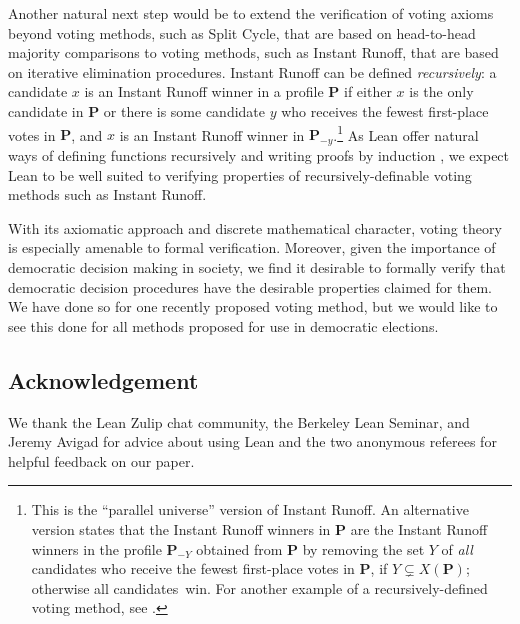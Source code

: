 \documentclass[runningheads]{llncs}
\begin{document}
Another natural next step would be to extend the verification of voting axioms beyond voting methods, such as Split Cycle, that are based on head-to-head majority comparisons to voting methods, such as Instant Runoff, that are based on iterative elimination procedures. Instant Runoff can be defined \textit{recursively}: a candidate $x$ is an Instant Runoff winner in a profile $\mathbf{P}$ if either $x$ is the only candidate in $\mathbf{P}$ or there is some candidate $y$ who receives the fewest first-place votes in $\mathbf{P}$, and $x$ is an Instant Runoff winner in $\mathbf{P}_{-y}$.\footnote{This is the ``parallel universe'' version of Instant Runoff. An alternative version \cite[p.~7]{Taylor2008} states that the Instant Runoff winners in $\mathbf{P}$ are the Instant Runoff winners in the profile $\mathbf{P}_{-Y}$ obtained from $\mathbf{P}$ by removing the set $Y$ of \textit{all} candidates who receive the fewest first-place votes in $\mathbf{P}$, if $Y\subsetneq X(\mathbf{P})$; otherwise all candidates~win. For another example of a recursively-defined voting method, see \cite{HPSV2021}.} As Lean offer natural ways of defining functions recursively and writing proofs by induction \cite[\S~8]{Avigad2021}, we expect Lean to be well suited to verifying properties of recursively-definable voting methods such as Instant Runoff.

With its axiomatic approach and discrete mathematical character, voting theory is especially amenable to formal verification. Moreover, given the importance of democratic decision making in society, we find it desirable to formally verify that democratic decision procedures have the desirable properties claimed for them. We have done so for one recently proposed voting method, but we would like to see this done for all methods proposed for use in democratic elections.

\subsection*{Acknowledgement}

We thank the Lean Zulip chat community, the Berkeley Lean Seminar, and Jeremy Avigad for advice about using Lean and the two anonymous referees for helpful feedback on our paper.

%
%
%
 
 
%
\end{document}
